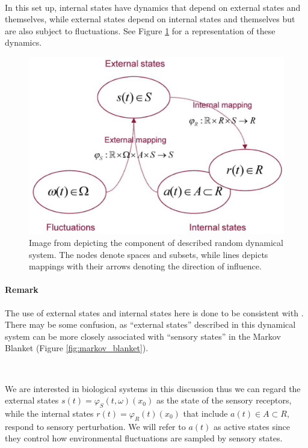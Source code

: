 \documentclass{article}
\begin{document}
\

In this set up, internal states have dynamics that depend on external states and themselves, while external states depend on internal states and themselves but are also subject to fluctuations. See Figure \ref{fig:random_dynamical_system} for a representation of these dynamics.

\begin{figure}[htbp]
    \centering
    \includegraphics[scale=0.5]{images/random_dynamical_system.png}
    \caption{Image from \citet{friston2012free} depicting the component of described random dynamical system. The nodes denote spaces and subsets, while lines depicts mappings with their arrows denoting the direction of influence.}
    \label{fig:random_dynamical_system}
\end{figure}

\paragraph{Remark} The use of external states and internal states here is done to be consistent with \citet{friston2012active}. There may be some confusion, as ``external states'' described in this dynamical system can be more closely associated with ``sensory states'' in the Markov Blanket (Figure \ref{fig:markov_blanket}).

\

We are interested in biological systems in this discussion thus we can regard the external states $s(t) = \varphi_S(t, \omega)(x_0)$ as the state of the sensory receptors, while the internal states $r(t) = \varphi_R(t)(x_0)$ that include $a(t) \in A \subset R$, respond to sensory perturbation. We will refer to $a(t)$ as active states since they control how environmental fluctuations are sampled by sensory states.
\end{document}
